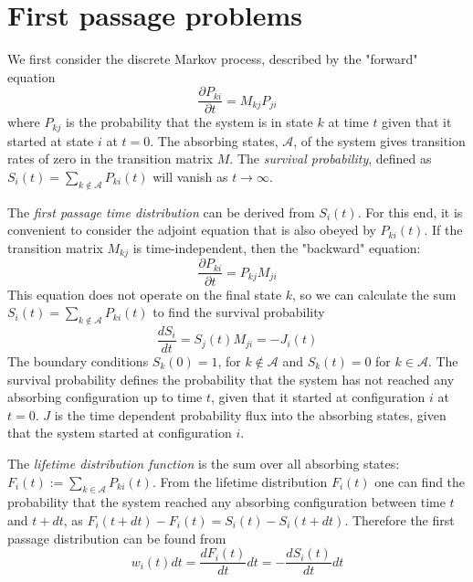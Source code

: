 \documentclass[12pt]{book}
\begin{document}
\section{First passage problems}\label{section:firstPassageProblems}
We first consider the discrete Markov process, described by the "forward" equation
\begin{equation*}
\frac{\partial P_{ki}}{\partial t}=M_{kj}P_{ji}
\end{equation*}
where $P_{kj}$ is the probability that the system is in state $k$ at time $t$ given that it started at state $i$ at $t=0$. The absorbing states, $\mathcal{A}$, of the system gives transition rates of zero in the transition matrix $M$. The \textit{survival probability}, defined as 
$S_{i}(t)=\sum_{k\notin\mathcal{A}}P_{ki}(t)$ will vanish as $t\rightarrow\infty$.

The \textit{first passage time distribution} can be derived from $S_i(t)$. For this end, it is convenient to consider the adjoint equation that is also obeyed by $P_{ki}(t)$. If the transition matrix $M_{kj}$ is time-independent, then the "backward" equation:
\begin{equation*}
\frac{\partial P_{ki}}{\partial t}=P_{kj}M_{ji}
\end{equation*}
This equation does not operate on the final state $k$, so we can calculate the sum $S_{i}(t)=\sum_{k\notin\mathcal{A}}P_{ki}(t)$ to find the survival probability 
\begin{equation*}
\frac{d S_i}{dt}=S_j(t)M_{ji}=-J_i(t)
\end{equation*}
The boundary conditions $S_k(0) = 1$, for $k\notin\mathcal{A}$ and $S_k(t)=0$ for $k\in\mathcal{A}$. The survival probability defines the probability that the system has not reached any absorbing configuration up to time $t$, given that it started at configuration $i$ at $t=0$. $J$ is the time dependent probability flux into the absorbing states, given that the system started at configuration $i$. 

The \textit{lifetime distribution function} is the sum over all absorbing states: $F_i(t):=\sum_{k\in\mathcal{A}}P_{ki}(t)$. From the lifetime distribution $F_i(t)$ one can find the probability that the system reached any absorbing configuration between time $t$ and $t+ dt$, as $F_i(t+dt)-F_i(t)=S_i(t)-S_i(t+dt)$. Therefore the first passage distribution can be found from 
\begin{equation*}
w_i(t)dt=\frac{dF_i(t)}{dt}dt =-\frac{dS_i(t)}{dt}dt
\end{equation*}
\end{document}
